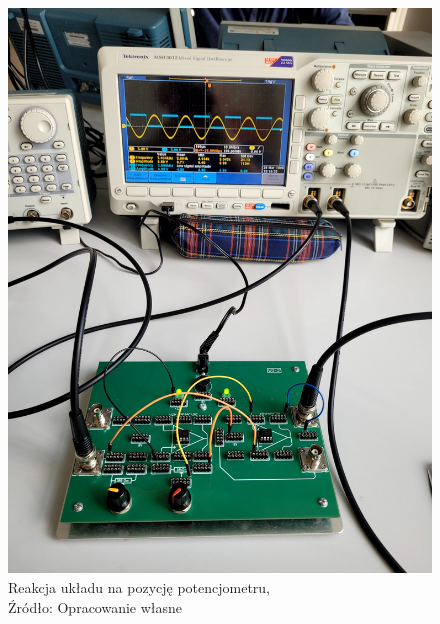 \documentclass{article}
\begin{document}
  \begin{figure}[!ht]
    \begin{minipage}{.5\textwidth}
      \centering
      \includegraphics[scale=0.06]{grafiki/reakcja2.jpg}
      \caption{Reakcja układu na pozycję potencjometru,
      \\Źródło: Opracowanie własne}
    \end{minipage}
    \begin{minipage}{.5\textwidth}
      \centering

\end{minipage}
\end{figure}
\end{document}
